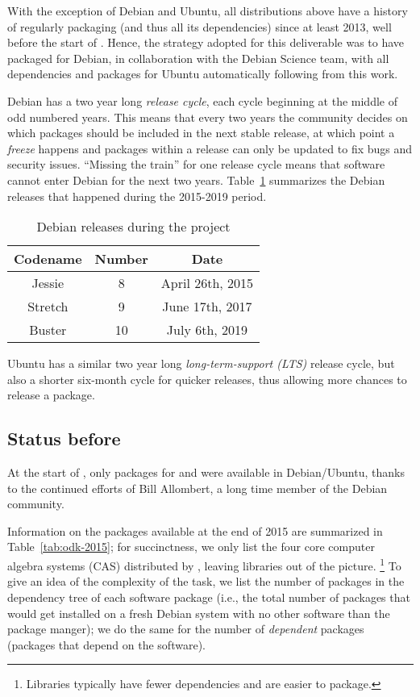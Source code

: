 \documentclass{deliverablereport}
\begin{document}
With the exception of Debian and Ubuntu, all distributions above have
a history of regularly packaging \Sage (and thus all its dependencies)
since at least 2013, well before the start of \ODK. %
Hence, the strategy adopted for this deliverable was to have \Sage
packaged for Debian, in collaboration with the Debian Science team,
with all \Sage dependencies and packages for Ubuntu automatically
following from this work.

Debian has a two year long \emph{release cycle}, each cycle beginning at the
middle of odd numbered years. %
This means that every two years the community decides on which
packages should be included in the next stable release, at which point
a \emph{freeze} happens and packages within a release can only be
updated to fix bugs and security issues. %
``Missing the train'' for one release cycle means that software
cannot enter Debian for the next two years. %
Table~\ref{tab:debian} summarizes the Debian releases that happened
during the 2015-2019 period.

\begin{table}[ht]
  \centering
  \begin{tabular}{c c c}
    Codename & Number & Date\\
    \hline
    Jessie & 8 & April 26th, 2015\\
    Stretch & 9 & June 17th, 2017\\
    Buster & 10 & July 6th, 2019
  \end{tabular}
  \caption{Debian releases during the \ODK project}
  \label{tab:debian}
\end{table}

Ubuntu has a similar two year long \emph{long-term-support (LTS)}
release cycle, but also a shorter six-month cycle for quicker
releases, thus allowing more chances to release a package.

\subsection{Status before \ODK}

At the start of \ODK, only packages for \PariGP and \GAP were
available in Debian/Ubuntu, thanks to the continued efforts of Bill
Allombert, a long time member of the Debian community. %

Information on the packages available at the end of 2015 are summarized in
Table~\ref{tab:odk-2015}; for succinctness, we only list the four
core computer algebra systems (CAS) distributed by \ODK, leaving libraries out
of the picture.%
\footnote{Libraries typically have fewer dependencies and are easier to
  package.} %
To give an idea of the complexity of the task, we list the number of
packages in the dependency tree of each software package (i.e., the total
number of packages that would get installed on a fresh Debian system
with no other software than the package manger); we do the same for
the number of \emph{dependent} packages (packages that depend on the
software).
\end{document}
